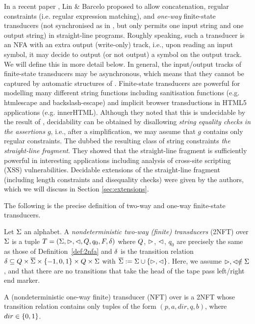 In a recent paper \cite{LB16}, Lin \& Barcelo 
proposed to allow concatenation, regular constraints (i.e. regular expression 
matching), and \emph{one-way} finite-state transducers (not synchronised as in \cite{BTV09}, but only permits one input string and one output string) in straight-line programs. 
Roughly speaking, such a transducer is an NFA with an extra output (write-only) 
track, i.e., upon reading an input symbol, it may decide to output (or not output) a symbol 
on the output track. We will define this in more detail below.
In general, the input/output tracks of finite-state transducers may be asynchronous, which means that they cannot be captured by automatic structures of \cite{BG04}. 
Finite-state transducers are powerful for modelling many
different string functions including sanitisation functions (e.g. htmlescape and
backslash-escape) and implicit browser transductions in HTML5 applications (e.g.
innerHTML). Although they noted that this is
undecidable by the result of \cite{BFL13}, decidability can be obtained 
by disallowing \emph{string equality checks in the assertions $g$}, i.e., after
a simplification, we may assume that $g$ contains only regular constraints.
The dubbed the
resulting class of string constraints \emph{the straight-line fragment}.
They showed that the straight-line fragment is sufficiently powerful in
interesting applications including analysis of cross-site scripting (XSS)
vulnerabilities. Decidable extensions of the straight-line fragment (including
length constraints and disequality checks) were given by the authors, which 
we will discuss in Section \ref{sec:extensions}.

The following is the precise definition
of two-way and one-way finite-state transducers.
\begin{definition}
    Let $\Sigma$ an alphabet.
    A \emph{nondeterministic two-way (finite) \emph{transducers}} (2NFT) over 
    $\Sigma$ is a tuple $T = (\Sigma, \vartriangleright, \vartriangleleft, Q, q_0, F, \delta)$ where  $Q$, $\vartriangleright$, $\vartriangleleft$, $q_0$ are precisely the same as those of Definition~\ref{def:2nfa}
%
and 
    $\delta$ is the
transition relation  $\delta\subseteq Q \times 
    \overline{\Sigma}\times \{-1, 0, 1\}\times 
    Q \times \Sigma$ with
    $\overline{\Sigma} := \Sigma \cup \{\vartriangleright,\vartriangleleft\}$.
    Here, we assume $\vartriangleright, \vartriangleleft \notin \Sigma$, and that
    there are no transitions that take the head of the tape pass left/right
    end marker. 

    A (nondeterministic one-way finite) transducer (NFT) over
    is a 2NFT whose transition relation contains only tuples of the form
    $(p,a,dir,q,b)$, where $dir \in \{0,1\}$.
\end{definition}


